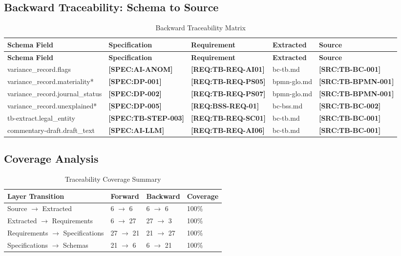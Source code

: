 \documentclass[11pt,a4paper]{article}
\newcommand{\srcref}[1]{\textcolor{sourcegreen}{\textbf{[SRC:#1]}}}
\newcommand{\reqref}[1]{\textcolor{reqpurple}{\textbf{[REQ:#1]}}}
\newcommand{\specref}[1]{\textcolor{specblue}{\textbf{[SPEC:#1]}}}
\begin{document}
\subsection{Backward Traceability: Schema to Source}

\begin{longtable}{@{}C{3cm}C{2.5cm}C{2.5cm}C{2cm}C{2.5cm}@{}}
\caption{Backward Traceability Matrix} \\
\toprule
\textbf{Schema Field} & \textbf{Specification} & \textbf{Requirement} & \textbf{Extracted} & \textbf{Source} \\
\midrule
\endfirsthead
\toprule
\textbf{Schema Field} & \textbf{Specification} & \textbf{Requirement} & \textbf{Extracted} & \textbf{Source} \\
\midrule
\endhead
variance\_record.flags & \specref{AI-ANOM} & \reqref{TB-REQ-AI01} & bc-tb.md & \srcref{TB-BC-001} \\
variance\_record.materiality* & \specref{DP-001} & \reqref{TB-REQ-PS05} & bpmn-glo.md & \srcref{TB-BPMN-001} \\
variance\_record.journal\_status & \specref{DP-002} & \reqref{TB-REQ-PS07} & bpmn-glo.md & \srcref{TB-BPMN-001} \\
variance\_record.unexplained* & \specref{DP-005} & \reqref{BSS-REQ-01} & bc-bss.md & \srcref{TB-BC-002} \\
tb-extract.legal\_entity & \specref{TB-STEP-003} & \reqref{TB-REQ-SC01} & bc-tb.md & \srcref{TB-BC-001} \\
commentary-draft.draft\_text & \specref{AI-LLM} & \reqref{TB-REQ-AI06} & bc-tb.md & \srcref{TB-BC-001} \\
\bottomrule
\end{longtable}

\subsection{Coverage Analysis}

\begin{table}[h]
\centering
\caption{Traceability Coverage Summary}
\begin{tabular}{@{}L{5cm}C{2.5cm}C{2.5cm}C{3cm}@{}}
\toprule
\textbf{Layer Transition} & \textbf{Forward} & \textbf{Backward} & \textbf{Coverage} \\
\midrule
Source $\rightarrow$ Extracted & 6 $\rightarrow$ 6 & 6 $\rightarrow$ 6 & 100\% \\
Extracted $\rightarrow$ Requirements & 6 $\rightarrow$ 27 & 27 $\rightarrow$ 3 & 100\% \\
Requirements $\rightarrow$ Specifications & 27 $\rightarrow$ 21 & 21 $\rightarrow$ 27 & 100\% \\
Specifications $\rightarrow$ Schemas & 21 $\rightarrow$ 6 & 6 $\rightarrow$ 21 & 100\% \\
\bottomrule
\end{tabular}
\end{table}
\end{document}
